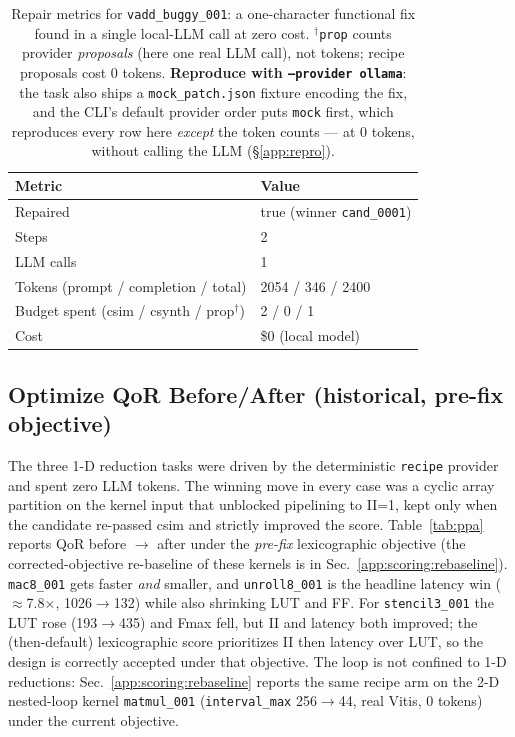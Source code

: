\begin{table}[h]
\centering
\small
\begin{tabular}{@{}ll@{}}
\toprule
Metric & Value \\
\midrule
Repaired & true (winner \texttt{cand\_0001}) \\
Steps & 2 \\
LLM calls & 1 \\
Tokens (prompt / completion / total) & 2054 / 346 / 2400 \\
Budget spent (csim / csynth / prop$^{\dagger}$) & 2 / 0 / 1 \\
Cost & \$0 (local model) \\
\bottomrule
\end{tabular}
\caption{Repair metrics for \texttt{vadd\_buggy\_001}: a one-character functional
fix found in a single local-LLM call at zero cost. $^{\dagger}$\texttt{prop} counts
provider \emph{proposals} (here one real LLM call), not tokens; recipe proposals cost
0 tokens. \textbf{Reproduce with \texttt{--provider ollama}}: the task also ships a
\texttt{mock\_patch.json} fixture encoding the fix, and the CLI's default provider
order puts \texttt{mock} first, which reproduces every row here \emph{except} the
token counts --- at 0 tokens, without calling the LLM (\S\ref{app:repro}).}
\label{tab:repair}
\end{table}

\subsection{Optimize QoR Before/After (historical, pre-fix objective)}\label{app:ppa}

The three 1-D reduction tasks were driven by the deterministic \texttt{recipe}
provider and spent zero LLM tokens. The winning move in every case was a cyclic
array partition on the kernel input that unblocked pipelining to II=1, kept only
when the candidate re-passed csim and strictly improved the score.
Table~\ref{tab:ppa} reports QoR before $\rightarrow$ after under the \emph{pre-fix}
lexicographic objective (the corrected-objective re-baseline of these kernels is in
Sec.~\ref{app:scoring:rebaseline}). \texttt{mac8\_001} gets
faster \emph{and} smaller, and \texttt{unroll8\_001} is the headline latency win
($\approx$7.8$\times$, 1026$\rightarrow$132) while also shrinking LUT and FF. For
\texttt{stencil3\_001} the LUT rose (193$\rightarrow$435) and Fmax fell, but II and
latency both improved; the (then-default) lexicographic score prioritizes II then
latency over LUT, so the design is correctly accepted under that objective.
The loop is not confined to 1-D reductions: Sec.~\ref{app:scoring:rebaseline} reports
the same recipe arm on the 2-D nested-loop kernel \texttt{matmul\_001}
(\texttt{interval\_max} 256$\rightarrow$44, real Vitis, 0 tokens) under the current
objective.


